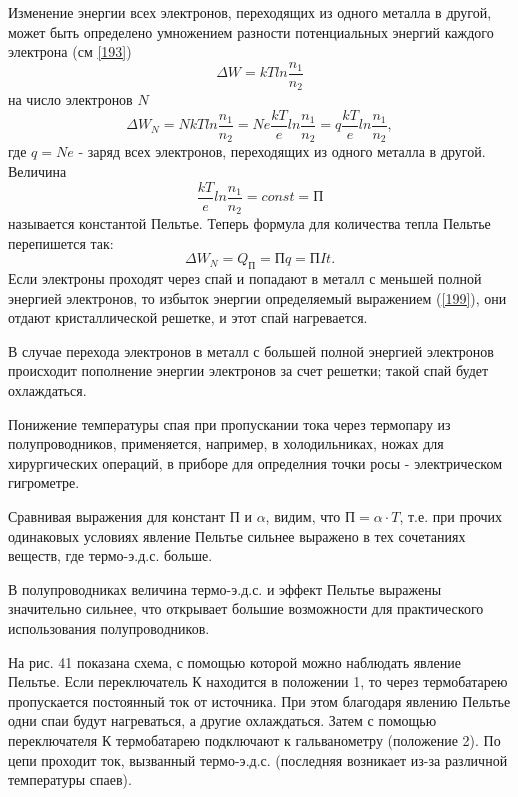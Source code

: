 \documentclass[a4paper,10pt]{book}
\begin{document}
Изменение энергии всех электронов, переходящих из одного металла в другой, может быть определено умножением разности потенциальных энергий каждого электрона (см \ref{193})
\begin{equation*}
 \Delta W = kTln\frac{n_1}{n_2}
\end{equation*}
на число электронов $N$
\begin{equation}\label{199}
 \Delta W_N = NkTln\frac{n_1}{n_2} = Ne\frac{kT}{e}ln\frac{n_1}{n_2} = q\frac{kT}{e}ln\frac{n_1}{n_2},
\end{equation}
где $q = Ne$ - заряд всех электронов, переходящих из одного металла в другой.
Величина
\begin{equation}\label{1910}
 \frac{kT}{e}ln\frac{n_1}{n_2} = const = \text{П}
\end{equation}
называется константой Пельтье. Теперь формула для количества тепла Пельтье перепишется так:
\begin{equation}\label{1911}
 \Delta W_N = Q_\text{П} = \text{П}q = \text{П}It.
\end{equation}
Если электроны проходят через спай и попадают в металл с меньшей полной энергией электронов, то избыток энергии определяемый выражением (\ref{199}), они отдают кристаллической решетке, и этот спай нагревается.

В случае перехода электронов в металл с большей полной энергией электронов происходит пополнение энергии электронов за счет решетки; такой спай будет охлаждаться.

Понижение температуры спая при пропускании тока через термопару из полупроводников, применяется, например, в холодильниках, ножах для хирургических операций, в приборе для определния точки росы - электрическом гигрометре.

Сравнивая выражения для констант П и $\alpha$, видим, что $\text{П}=\alpha\cdot T$, т.е. при прочих одинаковых условиях явление Пельтье сильнее выражено в тех сочетаниях веществ, где термо-э.д.с. больше.

В полупроводниках величина термо-э.д.с. и эффект Пельтье выражены значительно сильнее, что открывает большие возможности для практического использования полупроводников.

На рис. 41 показана схема, с помощью которой можно наблюдать явление Пельтье. Если переключатель К находится в положении 1, то через термобатарею пропускается постоянный ток от источника. При этом благодаря явлению Пельтье одни спаи будут нагреваться, а другие охлаждаться. Затем с помощью переключателя К термобатарею подключают к гальванометру (положение 2). По цепи проходит ток, вызванный термо-э.д.с. (последняя возникает из-за различной температуры спаев).
\end{document}
